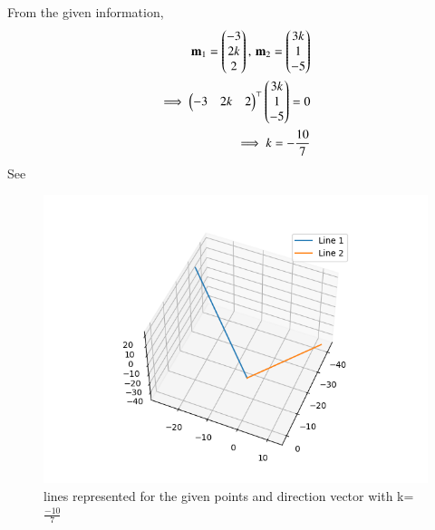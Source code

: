 From the given information,
\begin{align}
\mathbf{m}_1 = \begin{pmatrix}-3\\ 2k\\ 2\end{pmatrix},\,  \mathbf{m}_2 =\begin{pmatrix}3k\\ 1\\ -5\end{pmatrix} 
\\
	\implies \begin{pmatrix}-3& 2k& 2\end{pmatrix}^{\top} \begin{pmatrix}3k\\ 1\\ -5\end{pmatrix} =0
	\\
	\implies k = -\frac{10}{7}
\end{align}
See 
\begin{figure}[h!]
  \centering
   \includegraphics[width=\columnwidth]{chapters/12/11/4/6/figs/line_1.png}
    \caption{lines represented for the given points and direction vector with k=$\frac{-10}{7}$}
     \label{fig:chapters/12/11/4/6/1}
     \end{figure}  



